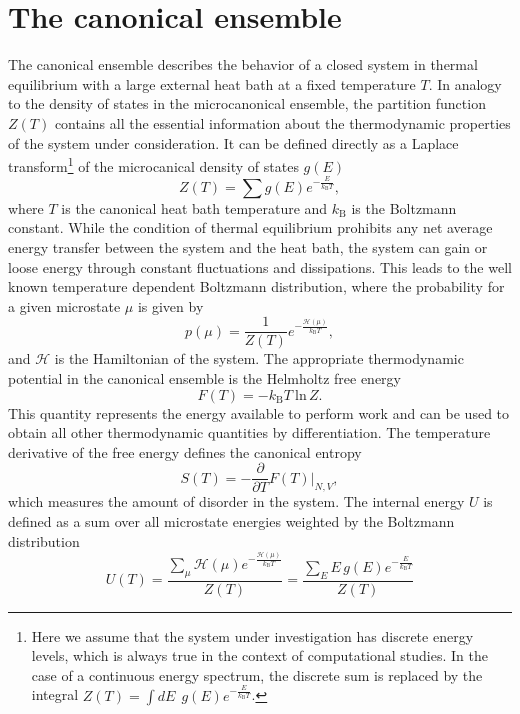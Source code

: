 \documentclass[12pt]{report}
\begin{document}
\section{The canonical ensemble}
The canonical ensemble describes the behavior of a closed system in thermal equilibrium with a large external heat bath at a fixed temperature $T$. In analogy to the density of states in the microcanonical ensemble, the partition function $Z(T)$ contains all the essential information about the thermodynamic properties of the system under consideration. It can be defined directly as a Laplace transform\footnote{Here we assume that the system under investigation has discrete energy levels, which is always true in the context of computational studies. In the case of a continuous energy spectrum, the discrete sum is replaced by the integral $Z(T) = \int dE \:\:  g(E) e^{-\frac{E}{k_{\mathrm{B}}T}}$.} of the microcanical density of states $g(E)$
\begin{equation}
Z(T) = \sum g(E) e^{-\frac{E}{k_{\mathrm{B}}T}},
\end{equation}
where $T$ is the canonical heat bath temperature and $k_{\mathrm{B}}$ is the Boltzmann constant. While the condition of thermal equilibrium prohibits any net average energy transfer between the system and the heat bath, the system can gain or loose energy through constant fluctuations and dissipations. This leads to the well known temperature dependent Boltzmann distribution, where the probability for a given microstate $\mu$ is given by 
\begin{equation}
p(\mu) = \frac{1}{Z(T)}e^{-\frac{\mathcal{H}(\mu)}{k_{\mathrm{B}}T}},
\end{equation}
and $\mathcal{H}$ is the Hamiltonian of the system. The appropriate thermodynamic potential in the canonical ensemble is the Helmholtz free energy
\begin{equation}
F(T) = -k_{\mathrm{B}}T \: \mathrm{ln}\, Z.
\end{equation}
This quantity represents the energy available to perform work and can be used to obtain all other thermodynamic quantities by differentiation. The temperature derivative of the free energy defines the canonical entropy
\begin{equation}
S(T) = -\frac{\partial}{\partial T}F(T)\bigg|_{N,V},
\end{equation} 
which measures the amount of disorder in the system.
The internal energy $U$ is defined as a sum over all microstate energies weighted by the Boltzmann distribution  
\begin{equation}
U(T) = \frac{\sum_{\mu} \mathcal{H}(\mu)e^{-\frac{\mathcal{H}(\mu)}{k_{\mathrm{B}}T}}}{Z(T)} =  \frac{\sum_{E} E \, g(E) e^{-\frac{E}{k_{\mathrm{B}}T}}}{Z(T)}
\end{equation}
\end{document}
